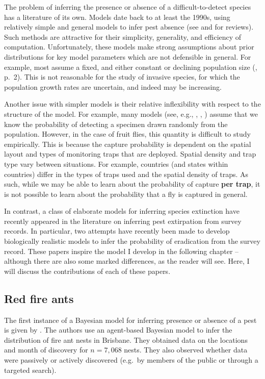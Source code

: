 \documentclass[
  oneside]{book}
\begin{document}
The problem of inferring the presence or absence of a difficult-to-detect species has a literature of its own. Models date back to at least the 1990s, using relatively simple and general models to infer pest absence (see \citet{boakes2015} and \citet{caley2014} for reviews). Such methods are attractive for their simplicity, generality, and efficiency of computation. Unfortunately, these models make strong assumptions about prior distributions for key model parameters which are not defensible in general. For example, most assume a fixed, and either constant or declining population size (\citet{caley2015}, p.~2). This is not reasonable for the study of invasive species, for which the population growth rates are uncertain, and indeed may be increasing.

Another issue with simpler models is their relative inflexibility with respect to the structure of the model. For example, many models (see, e.g., \citet{mcardle1990}, \citet{barnes2021}, \citet{boakes2015}) assume that we know the probability of detecting a specimen drawn randomly from the population. However, in the case of fruit flies, this quantity is difficult to study empirically. This is because the capture probability is dependent on the spatial layout and types of monitoring traps that are deployed. Spatial density and trap type vary between situations. For example, countries (and states within countries) differ in the types of traps used and the spatial density of traps. As such, while we may be able to learn about the probability of capture \textbf{per trap}, it is not possible to learn about the probability that a fly is captured in general.

In contrast, a class of elaborate models for inferring species extinction have recently appeared in the literature on inferring pest extirpation from survey records. In particular, two attempts have recently been made to develop biologically realistic models to infer the probability of eradication from the survey record. These papers inspire the model I develop in the following chapter -- although there are also some marked differences, as the reader will see. Here, I will discuss the contributions of each of these papers.

\hypertarget{red-fire-ants}{%
\subsection{Red fire ants}\label{red-fire-ants}}

The first instance of a Bayesian model for inferring presence or absence of a pest is given by \citet{keith2013}. The authors use an agent-based Bayesian model to infer the distribution of fire ant nests in Brisbane. They obtained data on the locations and month of discovery for \(n = 7{,}068\) nests. They also observed whether data were passively or actively discovered (e.g.~by members of the public or through a targeted search).
\end{document}
